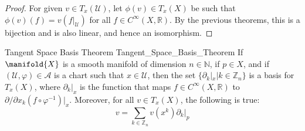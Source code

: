 \documentclass{article}                                                        %
\begin{document}
            \begin{proof}
                For given $v\in{T}_{x}(\mathcal{U})$, let $\phi(v)\in{T}_{x}(X)$
                be such that $\phi(v)(f)=v(f|_{\mathcal{U}})$ for all
                $f\in{C}^{\infty}(X,\mathbb{R})$. By the previous theorems, this
                is a bijection and is also linear, and hence an isomorphism.
            \end{proof}
            \begin{ftheorem}{Tangent Space Basis Theorem}
                            {Tangent_Space_Basis_Theorem}
                If $\manifold{X}$ is a smooth manifold of dimension
                $n\in\mathbb{N}$, if $p\in{X}$, and if
                $(\mathcal{U},\varphi)\in\mathcal{A}$ is a chart such that
                $x\in\mathcal{U}$, then the set
                $\{\partial_{k}|_{x}|k\in\mathbb{Z}_{n}\}$ is a basis for
                $T_{x}(X)$, where $\partial_{k}|_{x}$ is the function that maps
                $f\in{C}^{\infty}(X,\mathbb{R})$ to
                $\partial/\partial{x}_{k}(f\circ\varphi^{\minus{1}})|_{x}$.
                Moreover, for all $v\in{T}_{x}(X)$, the following is true:
                \begin{equation}
                    v=\sum_{k\in\mathbb{Z}_{n}}v(x^{k})\partial_{k}|_{p}
                \end{equation}
            \end{ftheorem}
\end{document}
